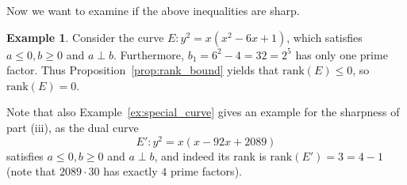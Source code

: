 \documentclass{scrartcl}
\theoremstyle{definition}
\newtheorem{example}[subsection]{Example}
\begin{document}
Now we want to examine if the above inequalities are sharp.
\begin{example}
    Consider the curve $E: y^2 = x(x^2 - 6x + 1)$, which satisfies $a \leq 0, b \geq 0$ and $a \perp b$.
    Furthermore, $b_1 = 6^2 - 4 = 32 = 2^5$ has only one prime factor.
    Thus Proposition~\ref{prop:rank_bound} yields that $\mathrm{rank}(E) \leq 0$, so $\mathrm{rank}(E) = 0$.
\end{example}
Note that also Example~\ref{ex:special_curve} gives an example for the sharpness of part (iii), as the dual curve
\begin{equation*}
    E': y^2 = x(x - 92 x + 2089)
\end{equation*}
satisfies $a \leq 0, b \geq 0$ and $a \perp b$, and indeed its rank is $\mathrm{rank}(E') = 3 = 4 - 1$ (note that $2089 \cdot 30$ has exactly $4$ prime factors).
\end{document}
